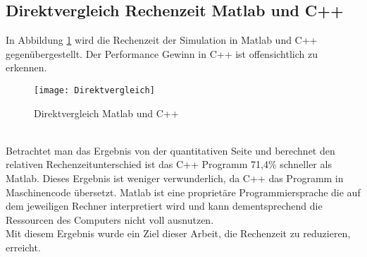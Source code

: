 \subsection{Direktvergleich Rechenzeit Matlab und C++}
In Abbildung \ref{fig:direktvergleich} wird die Rechenzeit der Simulation in Matlab und C++ gegenübergestellt. Der Performance Gewinn in C++ ist offensichtlich zu erkennen.
\begin{figure}[h]
	\centering
	\texttt{[image: Direktvergleich]}
	\caption{Direktvergleich Matlab und C++}
	\label{fig:direktvergleich}
\end{figure}\noindent \\
Betrachtet man das Ergebnis von der quantitativen Seite und berechnet den relativen Rechenzeitunterschied ist das C++ Programm 71,4\% schneller als Matlab. Dieses Ergebnis ist weniger verwunderlich, da C++ das Programm in Maschinencode übersetzt. Matlab ist eine proprietäre Programmiersprache die auf dem jeweiligen Rechner interpretiert wird und kann dementsprechend die Ressourcen des Computers nicht voll ausnutzen.\\
Mit diesem Ergebnis wurde ein Ziel dieser Arbeit, die Rechenzeit zu reduzieren, erreicht.
